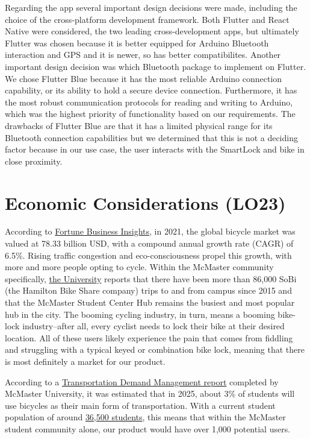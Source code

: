 \documentclass{article}
\begin{document}
Regarding the app several important design decisions were made, including the choice of the cross-platform development framework. Both Flutter and React Native were considered, the two leading cross-development apps, but ultimately Flutter was chosen because it is better equipped for Arduino Bluetooth interaction and GPS and it is newer, so has better compatibilites. Another important design decision was which Bluetooth package to implement on Flutter.  We chose Flutter Blue because it has the most reliable Arduino connection capability, or its ability to hold a secure device connection. Furthermore, it has the most robust communication protocols for reading and writing to Arduino, which was the highest priority of functionality based on our requirements. The drawbacks of Flutter Blue are that it has a limited physical range for its Bluetooth connection capabilities but we determined that this is not a deciding factor because in our use case, the user interacts with the SmartLock and bike in close proximity.

\section{Economic Considerations (LO23)}

According to \href{https://www.fortunebusinessinsights.com/bicycle-market-104524}{Fortune Business Insights}, in 2021, the global bicycle market was valued at 78.33 billion USD, with a compound annual growth rate (CAGR) of 6.5\%. Rising traffic congestion and eco-consciousness propel this growth, with more and more people opting to cycle. Within the McMaster community specifically, \href{https://un-sdgs.mcmaster.ca/more-on-the-sdgs/commuting-at-mcmaster/}{the University} reports that there have been more than 86,000 SoBi (the Hamilton Bike Share company) trips to and from campus since 2015 and that the McMaster Student Center Hub remains the busiest and most popular hub in the city. The booming cycling industry, in turn, means a booming bike-lock industry--after all, every cyclist needs to lock their bike at their desired location. All of these users likely experience the pain that comes from fiddling and struggling with a typical keyed or combination bike lock, meaning that there is most definitely a market for our product.

According to a \href{https://facilities.mcmaster.ca/app/uploads/2018/10/TDM_Jan161.pdf}{Transportation Demand Management report} completed by McMaster University, it was estimated that in 2025, about 3\% of students will use bicycles as their main form of transportation. With a current student population of around \href{https://www.google.com/search?q=mcmaster+student+population&rlz=1C1CHBF_enCA880CA880&oq=mcmaster+student+popu&aqs=chrome.0.0i512j69i57j0i22i30l2j0i390i650l5.5806j0j9&sourceid=chrome&ie=UTF-8}{36,500 students}, this means that within the McMaster student community alone, our product would have over 1,000 potential users. 
\end{document}

